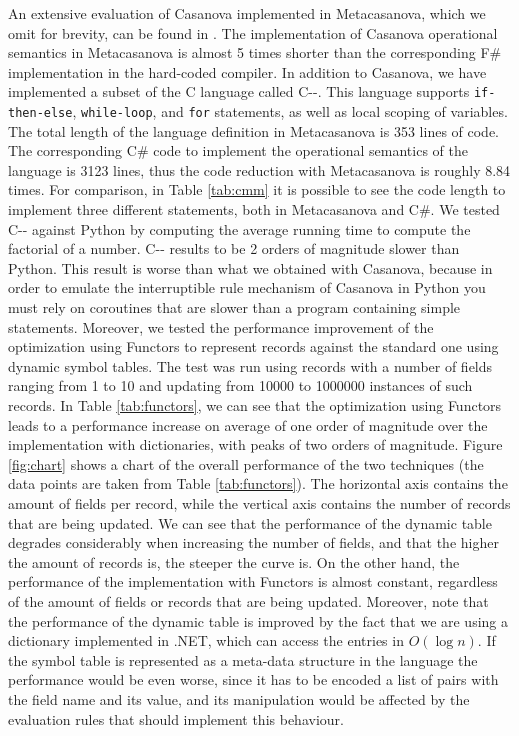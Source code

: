 An extensive evaluation of Casanova implemented in Metacasanova, which we omit for brevity, can be found in \cite{DiGiacomo2017}. The implementation of Casanova operational semantics in Metacasanova is almost 5 times shorter than the corresponding F\# implementation in the hard-coded compiler. In addition to Casanova, we have implemented a subset of the C language called C-{}-. This language supports \texttt{if-then-else}, \texttt{while-loop}, and \texttt{for} statements, as well as local scoping of variables. The total length of the language definition in Metacasanova is 353 lines of code. The corresponding C\# code to implement the operational semantics of the language is 3123 lines, thus the code reduction with Metacasanova is roughly 8.84 times. For comparison, in Table \ref{tab:cmm} it is possible to see the code length to implement three different statements, both in Metacasanova and C\#. We tested C-{}- against Python by computing the average running time to compute the factorial of a number. C-{}- results to be 2 orders of magnitude slower than Python. This result is worse than what we obtained with Casanova, because in order to emulate the interruptible rule mechanism of Casanova in Python you must rely on coroutines that are slower than a program containing simple statements. Moreover, we tested the performance improvement of the optimization using Functors to represent records against the standard one using dynamic symbol tables. The test was run using records with a number of fields ranging from 1 to 10 and updating from 10000 to 1000000 instances of such records. In Table \ref{tab:functors}, we can see that the optimization using Functors leads to a performance increase on average of one order of magnitude over the implementation with dictionaries, with peaks of two orders of magnitude. Figure \ref{fig:chart} shows a chart of the overall performance of the two techniques (the data points are taken from Table \ref{tab:functors}). The horizontal axis contains the amount of fields per record, while the vertical axis contains the number of records that are being updated. We can see that the performance of the dynamic table degrades considerably when increasing the number of fields, and that the higher the amount of records is, the steeper the curve is. On the other hand, the performance of the implementation with Functors is almost constant, regardless of the amount of fields or records that are being updated. Moreover, note that the performance of the dynamic table is improved by the fact that we are using a dictionary implemented in .NET, which can access the entries in $O(\log n)$. If the symbol table is represented as a meta-data structure in the language the performance would be even worse, since it has to be encoded a list of pairs with the field name and its value, and its manipulation would be affected by the evaluation rules that should implement this behaviour.

